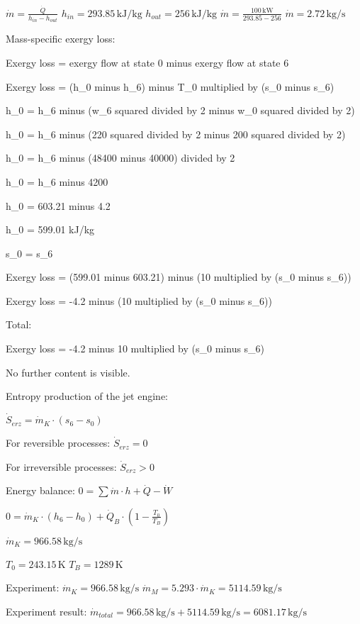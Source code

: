 \( \dot{m} = \frac{\dot{Q}}{h_{in} - h_{out}} \)  
\( h_{in} = 293.85 \, \text{kJ/kg} \)  
\( h_{out} = 256 \, \text{kJ/kg} \)  
\( \dot{m} = \frac{100 \, \text{kW}}{293.85 - 256} \)  
\( \dot{m} = 2.72 \, \text{kg/s} \)

Mass-specific exergy loss:  

Exergy loss = exergy flow at state 0 minus exergy flow at state 6  

Exergy loss = (h_0 minus h_6) minus T_0 multiplied by (s_0 minus s_6)  

h_0 = h_6 minus (w_6 squared divided by 2 minus w_0 squared divided by 2)  

h_0 = h_6 minus (220 squared divided by 2 minus 200 squared divided by 2)  

h_0 = h_6 minus (48400 minus 40000) divided by 2  

h_0 = h_6 minus 4200  

h_0 = 603.21 minus 4.2  

h_0 = 599.01 kJ/kg  

s_0 = s_6  

Exergy loss = (599.01 minus 603.21) minus (10 multiplied by (s_0 minus s_6))  

Exergy loss = -4.2 minus (10 multiplied by (s_0 minus s_6))  

Total:  

Exergy loss = -4.2 minus 10 multiplied by (s_0 minus s_6)  

No further content is visible.

Entropy production of the jet engine:  

\( \dot{S}_{erz} = \dot{m}_K \cdot \left( s_6 - s_0 \right) \)  

For reversible processes:  
\( \dot{S}_{erz} = 0 \)  

For irreversible processes:  
\( \dot{S}_{erz} > 0 \)  

Energy balance:  
\( 0 = \sum \dot{m} \cdot h + \dot{Q} - \dot{W} \)  

\( 0 = \dot{m}_K \cdot \left( h_6 - h_0 \right) + \dot{Q}_{B} \cdot \left( 1 - \frac{T_0}{T_B} \right) \)  

\( \dot{m}_K = 966.58 \, \text{kg/s} \)  

\( T_0 = 243.15 \, \text{K} \)  
\( T_B = 1289 \, \text{K} \)  

Experiment:  
\( \dot{m}_K = 966.58 \, \text{kg/s} \)  
\( \dot{m}_M = 5.293 \cdot \dot{m}_K = 5114.59 \, \text{kg/s} \)  

Experiment result:  
\( \dot{m}_{total} = 966.58 \, \text{kg/s} + 5114.59 \, \text{kg/s} = 6081.17 \, \text{kg/s} \)